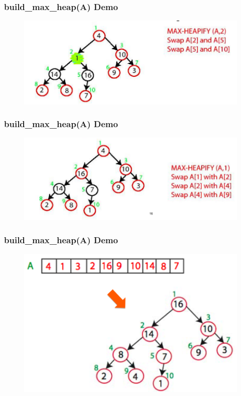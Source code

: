 \documentclass[11pt]{beamer}
\begin{document}
\begin{frame}
	\frametitle	{build\_max\_heap(A) Demo} 
	\begin{figure}
		\centering
		\includegraphics[width=1\linewidth]{"Screenshot 2020-12-23 at 9.30.18 PM"}
		\label{fig:screenshot-2020-12-23-at-9}
	\end{figure}
	
\end{frame}

\begin{frame}
	\frametitle	{build\_max\_heap(A) Demo} 
	\begin{figure}
		\centering
		\includegraphics[width=1\linewidth]{"Screenshot 2020-12-23 at 9.30.27 PM"}
		\label{fig:screenshot-2020-12-23-at-9}
	\end{figure}
	
\end{frame}

\begin{frame}
	\frametitle	{build\_max\_heap(A) Demo} 
	\begin{figure}
		\centering
		\includegraphics[width=1\linewidth]{"Screenshot 2020-12-23 at 9.30.40 PM"}
		\label{fig:screenshot-2020-12-23-at-9}
	\end{figure}
	
\end{frame}
\end{document}
